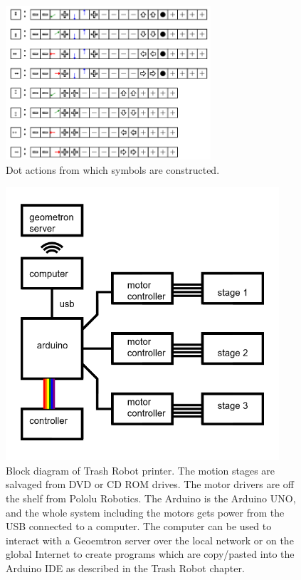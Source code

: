\begin{figure}
	\centering
	\includegraphics[width=3in]{figures/machines/actions05xx.png}
	\caption[actions05xx]
	{Dot actions from which symbols are constructed.}
\end{figure}

\begin{figure}
	\centering
	\includegraphics[width=4in]{figures/machines/printerblockdiagram.png}
	\caption[printerblockdiagram]
	{Block diagram of Trash Robot printer.  The motion stages are salvaged from DVD or CD ROM drives.  The motor drivers are off the shelf from Pololu Robotics.  The Arduino is the Arduino UNO, and the whole system including the motors gets power from the USB connected to a computer.  The computer can be used to interact with a Geoemtron server over the local network or on the global Internet to create programs which are copy/pasted into the Arduino IDE as described in the Trash Robot chapter.}
\end{figure}

